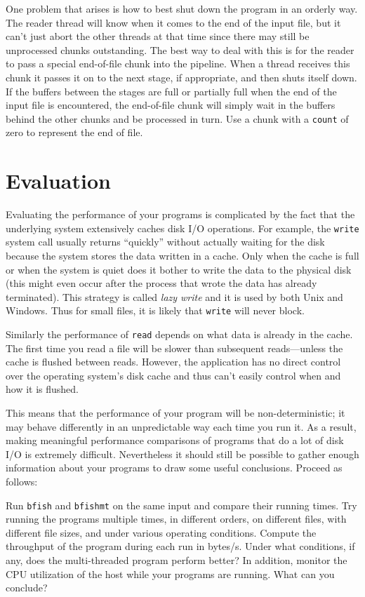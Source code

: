 \documentclass[twocolumn]{article}
\newcommand{\code}[1]{\texttt{#1}}
\newcommand{\filename}[1]{\texttt{#1}}
\newcommand{\newterm}[1]{\textit{#1}}
\begin{document}
One problem that arises is how to best shut down the program in an orderly way. The reader
thread will know when it comes to the end of the input file, but it can't just abort the other
threads at that time since there may still be unprocessed chunks outstanding. The best way to
deal with this is for the reader to pass a special end-of-file chunk into the pipeline. When a
thread receives this chunk it passes it on to the next stage, if appropriate, and then shuts
itself down. If the buffers between the stages are full or partially full when the end of the
input file is encountered, the end-of-file chunk will simply wait in the buffers behind the
other chunks and be processed in turn. Use a chunk with a \code{count} of zero to represent the
end of file.

\section{Evaluation}

Evaluating the performance of your programs is complicated by the fact that the underlying
system extensively caches disk I/O operations. For example, the \code{write} system call usually
returns ``quickly'' without actually waiting for the disk because the system stores the data
written in a cache. Only when the cache is full or when the system is quiet does it bother to
write the data to the physical disk (this might even occur after the process that wrote the data
has already terminated). This strategy is called \newterm{lazy write} and it is used by both
Unix and Windows. Thus for small files, it is likely that \code{write} will never block.

Similarly the performance of \code{read} depends on what data is already in the cache. The first
time you read a file will be slower than subsequent reads---unless the cache is flushed between
reads. However, the application has no direct control over the operating system's disk cache and
thus can't easily control when and how it is flushed.

This means that the performance of your program will be non-deterministic; it may behave
differently in an unpredictable way each time you run it. As a result, making meaningful
performance comparisons of programs that do a lot of disk I/O is extremely difficult.
Nevertheless it should still be possible to gather enough information about your programs to
draw some useful conclusions. Proceed as follows:

Run \filename{bfish} and \filename{bfishmt} on the same input and compare their running times.
Try running the programs multiple times, in different orders, on different files, with different
file sizes, and under various operating conditions. Compute the throughput of the program during
each run in bytes/s. Under what conditions, if any, does the multi-threaded program perform
better? In addition, monitor the CPU utilization of the host while your programs are running.
What can you conclude?
\end{document}
